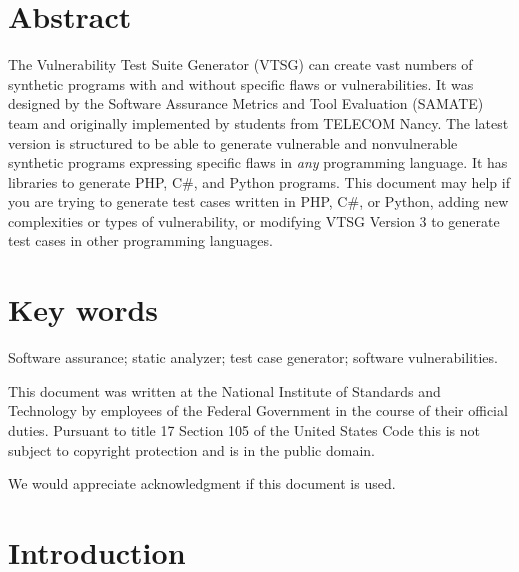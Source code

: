 \documentclass[12pt]{article}
\newcommand{\CSharp}{C{\fontseries{b}\selectfont\#}}
\begin{document}
\section*{Abstract}
\normalsize
The Vulnerability Test Suite Generator (VTSG) can create vast numbers of
synthetic programs with and without specific flaws or vulnerabilities.
It was designed by the Software Assurance Metrics and Tool Evaluation (SAMATE) team
and originally implemented by students from TELECOM Nancy.
The latest version is structured to be able to generate vulnerable and nonvulnerable
synthetic programs expressing specific flaws in \emph{any} programming language.
It has libraries to generate PHP, \CSharp, and Python programs.
This document may help if you are trying to generate test cases written in 
PHP, \CSharp, or Python, adding new complexities or types of vulnerability, or
modifying VTSG Version 3 to generate test
cases in other programming languages.

\section*{Key words}
\normalsize Software assurance; static analyzer; test case generator; 
software vulnerabilities.

\vfill

This document was written at the National Institute of Standards and
Technology by employees of the Federal Government in the course of
their official duties.  Pursuant to title 17 Section 105 of the United
States Code this is not subject to copyright protection and
is in the public domain.


We would appreciate acknowledgment if this document is used.

\pagebreak
\begin{center}
\tableofcontents
\listoffigures
\end{center}
\pagebreak

\newpage

\section{Introduction}
\end{document}
